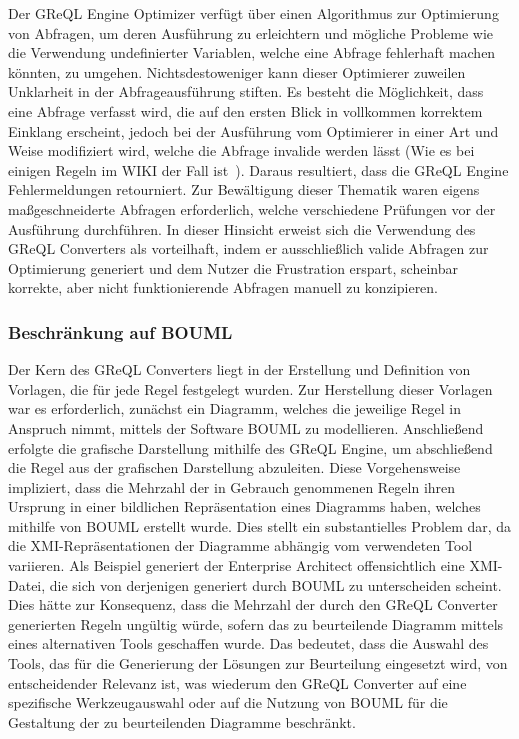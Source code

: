 Der GReQL Engine Optimizer  verfügt über einen Algorithmus zur Optimierung von Abfragen, um deren Ausführung zu
erleichtern und mögliche Probleme wie die Verwendung undefinierter Variablen, welche eine Abfrage fehlerhaft machen
könnten, zu umgehen. Nichtsdestoweniger kann dieser Optimierer zuweilen Unklarheit in der Abfrageausführung stiften.
Es besteht die Möglichkeit, dass eine Abfrage verfasst wird, die auf den ersten Blick in vollkommen korrektem Einklang
erscheint, jedoch bei der Ausführung vom Optimierer in einer Art und Weise modifiziert wird, welche die Abfrage invalide
werden lässt (Wie es bei einigen Regeln im WIKI der Fall ist~\cite{GReQL-wiki}). Daraus resultiert, dass die GReQL Engine
Fehlermeldungen retourniert. Zur Bewältigung dieser Thematik waren eigens maßgeschneiderte Abfragen erforderlich, welche
verschiedene Prüfungen vor der Ausführung durchführen. In dieser Hinsicht erweist sich die Verwendung des GReQL
Converters als vorteilhaft, indem er ausschließlich valide Abfragen zur Optimierung generiert und dem Nutzer die
Frustration erspart, scheinbar korrekte, aber nicht funktionierende Abfragen manuell zu konzipieren.


\subsubsection{Beschränkung auf BOUML}

Der Kern des GReQL Converters liegt in der Erstellung und Definition von Vorlagen, die für jede Regel festgelegt wurden.
Zur Herstellung dieser Vorlagen war es erforderlich, zunächst ein Diagramm, welches die jeweilige Regel in Anspruch
nimmt, mittels der Software BOUML zu modellieren. Anschließend erfolgte die grafische Darstellung mithilfe des GReQL
Engine, um abschließend die Regel aus der grafischen Darstellung abzuleiten. Diese Vorgehensweise impliziert, dass die
Mehrzahl der in Gebrauch genommenen Regeln ihren Ursprung in einer bildlichen Repräsentation eines Diagramms haben,
welches mithilfe von BOUML erstellt wurde. Dies stellt ein substantielles Problem dar, da die XMI-Repräsentationen der
Diagramme abhängig vom verwendeten Tool variieren. Als Beispiel generiert der Enterprise Architect offensichtlich eine
XMI-Datei, die sich von derjenigen generiert durch BOUML zu unterscheiden scheint. Dies hätte zur Konsequenz, dass die
Mehrzahl der durch den GReQL Converter generierten Regeln ungültig würde, sofern das zu beurteilende Diagramm mittels
eines alternativen Tools geschaffen wurde. Das bedeutet, dass die Auswahl des Tools, das für die Generierung der
Lösungen zur Beurteilung eingesetzt wird, von entscheidender Relevanz ist, was wiederum den GReQL Converter auf eine
spezifische Werkzeugauswahl oder auf die Nutzung von BOUML für die Gestaltung der zu beurteilenden Diagramme beschränkt.

